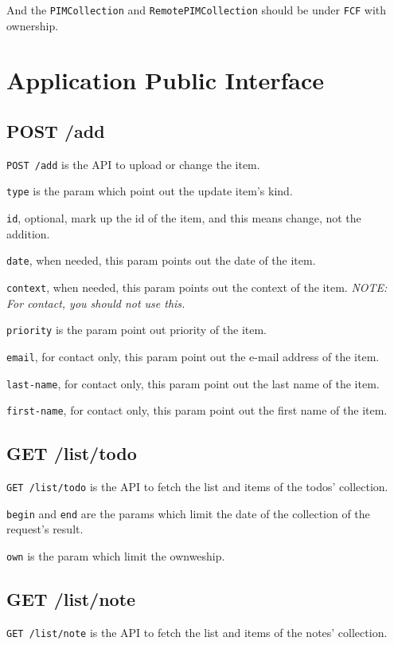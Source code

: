\documentclass{article}
\begin{document}
  And the \lstinline|PIMCollection| and \lstinline|RemotePIMCollection| should be under \verb|FCF| with ownership.


  \section{Application Public Interface}

  \subsection{POST /add}

  \verb|POST /add| is the API to upload or change the item.

  \verb|type| is the param which point out the update item's kind.

  \verb|id|, optional, mark up the id of the item, and this means change, not the addition.

  \verb|date|, when needed, this param points out the date of the item.

  \verb|context|, when needed, this param points out the context of the item. \textit{NOTE: For contact, you should not use this.}

  \verb|priority| is the param point out priority of the item.

  \verb|email|, for contact only, this param point out the e-mail address of the item.

  \verb|last-name|, for contact only, this param point out the last name of the item.

  \verb|first-name|, for contact only, this param point out the first name of the item.

  \subsection{GET /list/todo}

  \verb|GET /list/todo| is the API to fetch the list and items of the todos' collection.

  \verb|begin| and \verb|end| are the params which limit the date of the collection of the request's result.

  \verb|own| is the param which limit the ownweship.


  \subsection{GET /list/note}

  \verb|GET /list/note| is the API to fetch the list and items of the notes' collection.
\end{document}
